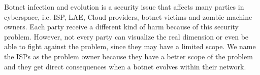 Botnet infection and evolution is a security issue that affects many parties in cyberspace, i.e. ISP, LAE, Cloud providers, botnet victims and zombie machine owners. Each party receive a different kind of harm because of this security problem. However, not every party can visualize the real dimension or even be able to fight against the problem, since they may have a limited scope. We name the ISPs as the problem owner because they have a better scope of the problem and they get direct consequences when a botnet evolves within their network.

